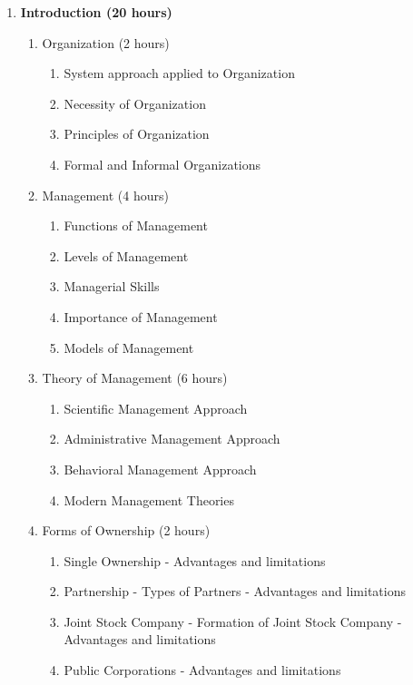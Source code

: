 \begin{enumerate}
  \item \textbf{Introduction \hfill (20 hours)}
    \begin{enumerate}
      \item Organization \hfill (2 hours)
        \begin{enumerate}
          \item System approach applied to Organization
          \item Necessity of Organization
          \item Principles of Organization
          \item Formal and Informal Organizations
        \end{enumerate}

      \item Management \hfill (4 hours)
        \begin{enumerate}
          \item Functions of Management
          \item Levels of Management
          \item Managerial Skills
          \item Importance of Management
          \item Models of Management
        \end{enumerate}

      \item Theory of Management \hfill (6 hours)
        \begin{enumerate}
          \item Scientific Management Approach
          \item Administrative Management Approach
          \item Behavioral Management Approach
          \item Modern Management Theories
        \end{enumerate}

      \item Forms of Ownership \hfill (2 hours)
        \begin{enumerate}
          \item Single Ownership - Advantages and limitations
          \item Partnership - Types of Partners - Advantages and limitations
          \item Joint Stock Company - Formation of Joint Stock Company - Advantages and limitations
          \item Public Corporations - Advantages and limitations
        \end{enumerate}
        

\end{enumerate}
\end{enumerate}
